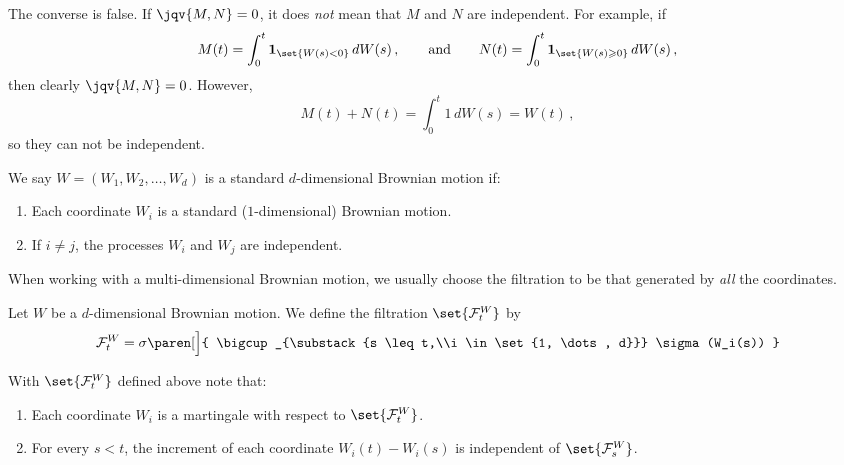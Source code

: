 \begin{remark}
  The converse is false.
  If $\jqv{M,N} = 0$, it does \emph{not} mean that $M$ and $N$ are independent.
  For example, if
  \begin{equation*}
    M(t) = \int_0^t \one_{\set{W(s) < 0}} \, dW(s)\,,
    \qquad\text{and}\qquad
    N(t) = \int_0^t \one_{\set{W(s) \geq 0}} \, dW(s)\,,
  \end{equation*}
  then clearly $\jqv{M,N} = 0$.
  However,
  \begin{equation*}
    M(t) + N(t) = \int_0^t 1 \, dW(s) = W(t)\,,
  \end{equation*}
  so they can not be independent.
\end{remark}

\begin{definition}
  We say $W = (W_1, W_2, \dots, W_d)$ is a standard $d$-dimensional Brownian motion if:
  \begin{enumerate}
    \item
      Each coordinate $W_i$ is a standard ($1$-dimensional) Brownian motion.
    \item
      If $i \neq j$, the processes $W_i$ and $W_j$ are independent.
  \end{enumerate}
\end{definition}

When working with a multi-dimensional Brownian motion, we usually choose the filtration to be that generated by \emph{all} the coordinates.

\begin{definition}
  Let $W$ be a $d$-dimensional Brownian motion.
  We define the filtration $\set{\mathcal F_t^W}$ by
  \begin{equation*}
    \mathcal F_t^W = \sigma\paren[\Big]{ \bigcup_{\substack{s \leq t,\\i \in \set{1, \dots, d}}} \sigma(W_i(s)) }
  \end{equation*}
\end{definition}

With $\set{\mathcal F_t^W}$ defined above note that:
\begin{enumerate}
  \item
    Each coordinate $W_i$ is a martingale with respect to $\set{\mathcal F_t^W}$.

  \item
    For every $s < t$, the increment of each coordinate $W_i(t) - W_i(s)$ is independent of $\set{\mathcal F_s^W}$.
\end{enumerate}

